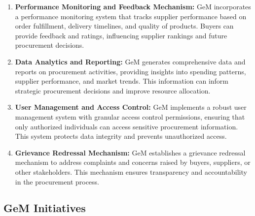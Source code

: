 \begin{enumerate}
    \item \textbf{Performance Monitoring and Feedback Mechanism:} GeM incorporates a performance monitoring system that tracks supplier performance based on order fulfillment, delivery timelines, and quality of products. Buyers can provide feedback and ratings, influencing supplier rankings and future procurement decisions.
    
    \item \textbf{Data Analytics and Reporting:} GeM generates comprehensive data and reports on procurement activities, providing insights into spending patterns, supplier performance, and market trends. This information can inform strategic procurement decisions and improve resource allocation.
    
    \item \textbf{User Management and Access Control:} GeM implements a robust user management system with granular access control permissions, ensuring that only authorized individuals can access sensitive procurement information. This system protects data integrity and prevents unauthorized access.
    
    \item \textbf{Grievance Redressal Mechanism:} GeM establishes a grievance redressal mechanism to address complaints and concerns raised by buyers, suppliers, or other stakeholders. This mechanism ensures transparency and accountability in the procurement process.
\end{enumerate}

\subsection{GeM Initiatives}

